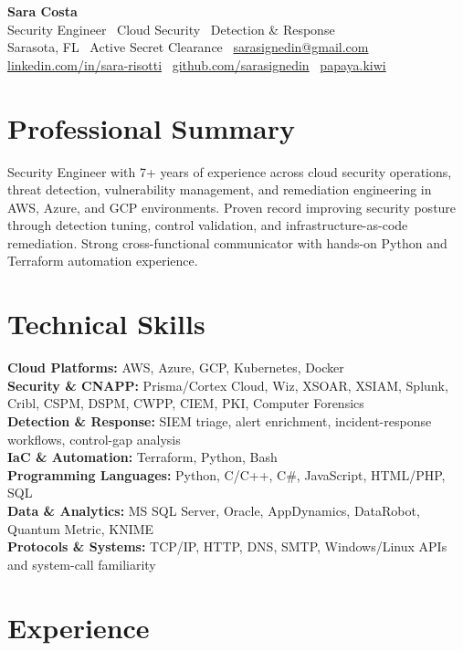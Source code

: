 \documentclass[10pt,letterpaper]{article}
\begin{document}
{\Huge \textbf{Sara Costa}} \\
{\large Security Engineer \textbar\ Cloud Security \textbar\ Detection \& Response} \\
\vspace{3pt}
Sarasota, FL \textbar\ Active Secret Clearance \textbar\ \href{mailto:sarasignedin@gmail.com}{sarasignedin@gmail.com} \\
\href{https://www.linkedin.com/in/sara-risotti}{linkedin.com/in/sara-risotti} \textbar\ \href{https://github.com/sarasignedin}{github.com/sarasignedin} \textbar\ \href{https://papaya.kiwi}{papaya.kiwi}

\section*{Professional Summary}
Security Engineer with 7+ years of experience across cloud security operations, threat detection, vulnerability management, and remediation engineering in AWS, Azure, and GCP environments. Proven record improving security posture through detection tuning, control validation, and infrastructure-as-code remediation. Strong cross-functional communicator with hands-on Python and Terraform automation experience.

\section*{Technical Skills}
\textbf{Cloud Platforms:} AWS, Azure, GCP, Kubernetes, Docker \\[3pt]
\textbf{Security \& CNAPP:} Prisma/Cortex Cloud, Wiz, XSOAR, XSIAM, Splunk, Cribl, CSPM, DSPM, CWPP, CIEM, PKI, Computer Forensics \\[3pt]
\textbf{Detection \& Response:} SIEM triage, alert enrichment, incident-response workflows, control-gap analysis \\[3pt]
\textbf{IaC \& Automation:} Terraform, Python, Bash \\[3pt]
\textbf{Programming Languages:} Python, C/C++, C\#, JavaScript, HTML/PHP, SQL \\[3pt]
\textbf{Data \& Analytics:} MS SQL Server, Oracle, AppDynamics, DataRobot, Quantum Metric, KNIME \\[3pt]
\textbf{Protocols \& Systems:} TCP/IP, HTTP, DNS, SMTP, Windows/Linux APIs and system-call familiarity

\section*{Experience}
\end{document}
